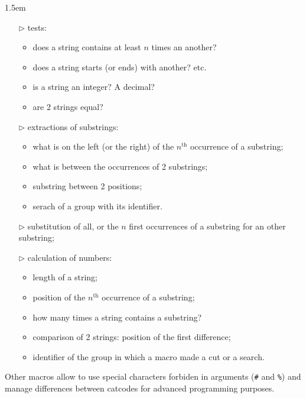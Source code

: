 \documentclass[a4paper,10pt]{article}
\renewcommand\th{${}^\text{th}$\xspace}
\begin{document}
\begin{titlepage}
\begin{center}
\begin{minipage}{0.85\linewidth}
			\parindent1.5em
			\begin{itemize}
				\item[$\triangleright$] tests:
					\begin{itemize}
						\item does a string contains at least $n$ times an another?
						\item does a string starts (or ends) with another? etc.
						\item is a string an integer? A decimal?
						\item are 2 strings equal?
					\end{itemize}
				\item[$\triangleright$] extractions of substrings:
					\begin{itemize}
						\item what is on the left (or the right) of the $n$\th occurrence of a substring;
						\item what is between the occurrences of 2 substrings;
						\item substring between 2 positions;
						\item serach of a group with its identifier.
					\end{itemize}
				\item[$\triangleright$] substitution of all, or the $n$ first occurrences of a substring for an other substring;
				\item[$\triangleright$] calculation of numbers:
					\begin{itemize}
						\item length of a string;
						\item position of the $n$\th occurrence of a substring;
						\item how many times a string contains a substring?
						\item comparison of 2 strings: position of the first difference;
						\item identifier of the group in which a macro made a cut or a search.
					\end{itemize}
			\end{itemize}
			\parindent0pt
			\medskip
			Other macros allow to use special characters forbiden in arguments (\verb|#| and \verb|%|) and manage differences between catcodes for advanced programming purposes.
		\end{minipage}
	\end{center}
	\hrulefill\vfill{}
\end{titlepage}
\end{document}
